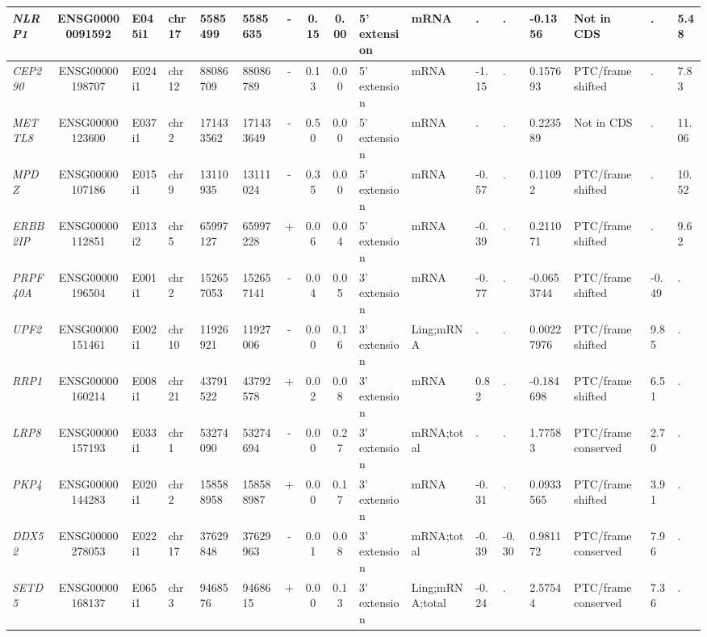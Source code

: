 \begin{appendices}
\begin{landscape}
\begin{table}
{\begin{tabular}{|l|c|l|l|l|l|c|c|c|l|l|l|l|l|l|l|l|}
		\textit{NLRP1} & ENSG00000091592 & E045i1 & chr17 & 5585499 & 5585635 & -     & 0.15  & 0.00  & 5' extension & mRNA  & . & . & -0.1356 & Not in CDS     & . &  5.48 \\ \hline
		\textit{CEP290} & ENSG00000198707 & E024i1 & chr12 & 88086709 & 88086789 & -     & 0.13  & 0.00  & 5' extension & mRNA  & -1.15 & . & 0.157693 & PTC/frame shifted & . &  7.83 \\ \hline
		\textit{METTL8} & ENSG00000123600 & E037i1 & chr2  & 171433562 & 171433649 & -     & 0.50  & 0.00  & 5' extension & mRNA  & . & . & 0.223589 & Not in CDS     & . &  11.06 \\ \hline
		\textit{MPDZ} & ENSG00000107186 & E015i1 & chr9  & 13110935 & 13111024 & -     & 0.35  & 0.00  & 5' extension & mRNA  & -0.57 & . & 0.11092 & PTC/frame shifted & . &  10.52 \\ \hline
		\textit{ERBB2IP} & ENSG00000112851 & E013i2 & chr5  & 65997127 & 65997228 & +     & 0.06  & 0.04  & 5' extension & mRNA  & -0.39 & . & 0.211071 & PTC/frame shifted & . &  9.62 \\ \hline
		\textit{PRPF40A} & ENSG00000196504 & E001i1 & chr2  & 152657053 & 152657141 & -     & 0.04  & 0.05  & 3' extension & mRNA  & -0.77 & . & -0.0653744 & PTC/frame shifted & -0.49 & . \\ \hline
		\textit{UPF2} & ENSG00000151461 & E002i1 & chr10 & 11926921 & 11927006 & -     & 0.00  & 0.16  & 3' extension & Ling;mRNA & . & . & 0.00227976 & PTC/frame shifted & 9.85  & . \\ \hline
		\textit{RRP1} & ENSG00000160214 & E008i1 & chr21 & 43791522 & 43792578 & +     & 0.02  & 0.08  & 3' extension & mRNA  & 0.82  & . & -0.184698 & PTC/frame shifted & 6.51  & . \\ \hline
		\textit{LRP8} & ENSG00000157193 & E033i1 & chr1  & 53274090 & 53274694 & -     & 0.00  & 0.27  & 3' extension & mRNA;total & . & . & 1.77583 & PTC/frame conserved & 2.70  & . \\ \hline
		\textit{PKP4} & ENSG00000144283 & E020i1 & chr2  & 158588958 & 158588987 & +     & 0.00  & 0.17  & 3' extension & mRNA  & -0.31 & . & 0.0933565 & PTC/frame shifted & 3.91  & . \\ \hline
		\textit{DDX52} & ENSG00000278053 & E022i1 & chr17 & 37629848 & 37629963 & -     & 0.01  & 0.08  & 3' extension & mRNA;total & -0.39 & -0.30 & 0.981172 & PTC/frame conserved & 7.96  & . \\ \hline
		\textit{SETD5} & ENSG00000168137 & E065i1 & chr3  & 9468576 & 9468615 & +     & 0.00  & 0.13  & 3' extension & Ling;mRNA;total & -0.24 & . & 2.57544 & PTC/frame conserved & 7.36  & . \\ \hline

\end{tabular}}
\end{table}
\end{landscape}
\end{appendices}
